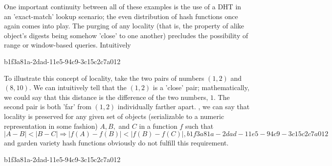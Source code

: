 \documentclass[12pt]{article}
\begin{document}
\par One important continuity between all of these examples is the use of a DHT in an 'exact-match' lookup scenario; the even distribution of hash functions once again comes into play. The purging of any locality (that is, the property of alike object's digests being somehow 'close' to one another) precludes the possibility of range or window-based queries. Intuitively

b1f3a81a-2dad-11e5-94c9-3c15c2c7a012\par To illustrate this concept of locality, take the two pairs of numbers $(1,2)$ and $(8,10)$. We can intuitively tell that the $(1,2)$ is a 'close' pair; mathematically, we could say that this distance is the difference of the two numbers, $1$. The second pair is both 'far' from $(1,2)$ individually farther apart. , we can say that locality is preserved for any given set of objects (serializable to a numeric representation in some fashion) $A,B,$ and $C$ in a function $f$ such that
\begin{equation}
|A-B| < |B-C| \Rightarrow |f(A)-f(B)| < |f(B) - f(C)|,
b1f3a81a-2dad-11e5-94c9-3c15c2c7a012\end{equation}
and garden variety hash functions obviously do not fulfill this requirement.

b1f3a81a-2dad-11e5-94c9-3c15c2c7a012\printbibliography
\end{document}
